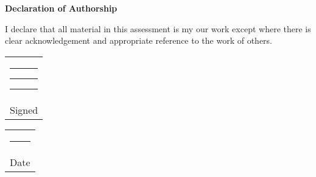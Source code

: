 \leavevmode%
\vfill\noindent
\begin{center}
  \textbf{Declaration of Authorship}
\end{center}
I declare that all material in this assessment is my our work except where there is clear acknowledgement and appropriate reference to the work of others.

\vspace*{4em}\noindent
\hfill%
\begin{tabular}[t]{c}
  \rule{10em}{0.4pt} \rule{10em}{0.4pt} \rule{10em}{0.4pt}\\ Signed
\end{tabular}%
\hfill%
\begin{tabular}[t]{c}
\rule{10em}{0.4pt}\\ Date
\end{tabular}%
\hfill
\strut
\vspace{4em}
